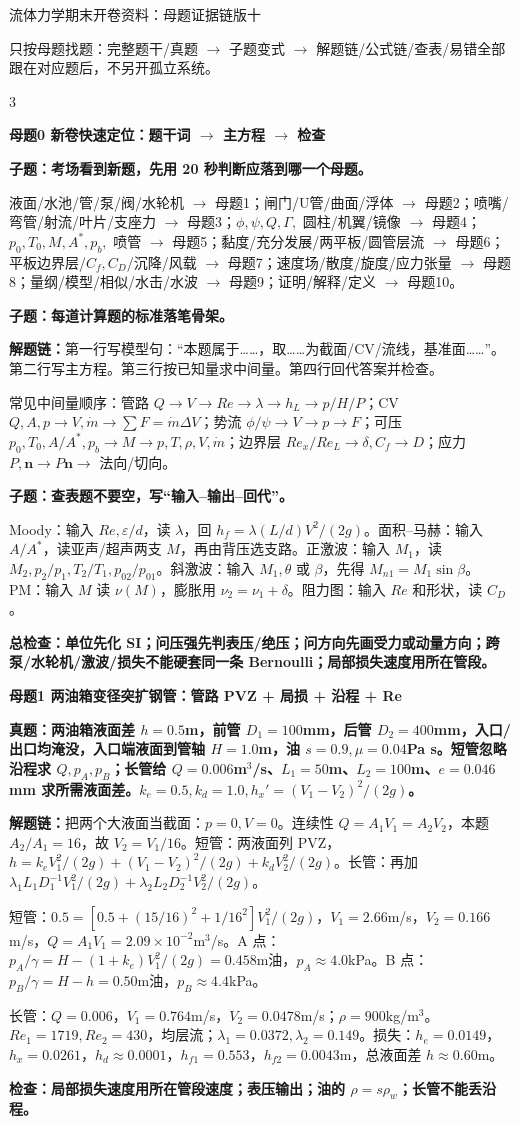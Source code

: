 \documentclass[a4paper]{article}
\newcommand{\mt}[1]{\vspace{0.45pt}\colorbox{M}{\parbox{\dimexpr\linewidth-2\fboxsep}{\color{white}\bfseries #1}}\par}
\newcommand{\qt}[1]{\vspace{0.25pt}\colorbox{Q}{\parbox{\dimexpr\linewidth-2\fboxsep}{\color{white}\bfseries #1}}\par}
\newcommand{\ans}[1]{\colorbox{G}{\parbox{\dimexpr\linewidth-2\fboxsep}{#1}}\par}
\newcommand{\warn}[1]{\colorbox{Y}{\parbox{\dimexpr\linewidth-2\fboxsep}{\color{E}\bfseries #1}}\par}
\newcommand{\chain}[1]{{\color{A}\bfseries 解题链：}#1\par}
\begin{document}
\fontsize{3.08}{3.22}\selectfont
\begin{center}
{\heiti\fontsize{6.5}{6.8}\selectfont 流体力学期末开卷资料：母题证据链版十}\par
{\fontsize{3.20}{3.38}\selectfont 只按母题找题：完整题干/真题 $\to$ 子题变式 $\to$ 解题链/公式链/查表/易错全部跟在对应题后，不另开孤立系统。}
\end{center}
\vspace{-3.4pt}
\begin{multicols}{3}

\mt{母题0 新卷快速定位：题干词 $\to$ 主方程 $\to$ 检查}
\qt{子题：考场看到新题，先用 20 秒判断应落到哪一个母题。}
\ans{液面/水池/管/泵/阀/水轮机 $\to$ 母题1；闸门/U管/曲面/浮体 $\to$ 母题2；喷嘴/弯管/射流/叶片/支座力 $\to$ 母题3；$\phi,\psi,Q,\Gamma,$ 圆柱/机翼/镜像 $\to$ 母题4；$p_0,T_0,M,A^*,p_b,$ 喷管 $\to$ 母题5；黏度/充分发展/两平板/圆管层流 $\to$ 母题6；平板边界层/$C_f,C_D$/沉降/风载 $\to$ 母题7；速度场/散度/旋度/应力张量 $\to$ 母题8；量纲/模型/相似/水击/水波 $\to$ 母题9；证明/解释/定义 $\to$ 母题10。}
\qt{子题：每道计算题的标准落笔骨架。}
\chain{第一行写模型句：“本题属于……，取……为截面/CV/流线，基准面……”。第二行写主方程。第三行按已知量求中间量。第四行回代答案并检查。}
\ans{常见中间量顺序：管路 $Q\to V\to Re\to\lambda\to h_L\to p/H/P$；CV $Q,A,p\to V,\dot m\to \sum F=\dot m\Delta V$；势流 $\phi/\psi\to V\to p\to F$；可压 $p_0,T_0,A/A^*,p_b\to M\to p,T,\rho,V,\dot m$；边界层 $Re_x/Re_L\to\delta,C_f\to D$；应力 $P,\bm n\to P\bm n\to$ 法向/切向。}
\qt{子题：查表题不要空，写“输入--输出--回代”。}
\ans{Moody：输入 $Re,\varepsilon/d$，读 $\lambda$，回 $h_f=\lambda(L/d)V^2/(2g)$。面积--马赫：输入 $A/A^*$，读亚声/超声两支 $M$，再由背压选支路。正激波：输入 $M_1$，读 $M_2,p_2/p_1,T_2/T_1,p_{02}/p_{01}$。斜激波：输入 $M_1,\theta$ 或 $\beta$，先得 $M_{n1}=M_1\sin\beta$。PM：输入 $M$ 读 $\nu(M)$，膨胀用 $\nu_2=\nu_1+\delta$。阻力图：输入 $Re$ 和形状，读 $C_D$。}
\warn{总检查：单位先化 SI；问压强先判表压/绝压；问方向先画受力或动量方向；跨泵/水轮机/激波/损失不能硬套同一条 Bernoulli；局部损失速度用所在管段。}


\mt{母题1 两油箱变径突扩钢管：管路 PVZ + 局损 + 沿程 + Re}
\qt{真题：两油箱液面差 $h=0.5$m，前管 $D_1=100$mm，后管 $D_2=400$mm，入口/出口均淹没，入口端液面到管轴 $H=1.0$m，油 $s=0.9,\mu=0.04$Pa s。短管忽略沿程求 $Q,p_A,p_B$；长管给 $Q=0.006$m$^3$/s、$L_1=50$m、$L_2=100$m、$e=0.046$mm 求所需液面差。$k_e=0.5,k_d=1.0,h_x'=(V_1-V_2)^2/(2g)$。}
\chain{把两个大液面当截面：$p=0,V=0$。连续性 $Q=A_1V_1=A_2V_2$，本题 $A_2/A_1=16$，故 $V_2=V_1/16$。短管：两液面列 PVZ，$h=k_eV_1^2/(2g)+(V_1-V_2)^2/(2g)+k_dV_2^2/(2g)$。长管：再加 $\lambda_1L_1D_1^{-1}V_1^2/(2g)+\lambda_2L_2D_2^{-1}V_2^2/(2g)$。}
\ans{短管：$0.5=[0.5+(15/16)^2+1/16^2]V_1^2/(2g)$，$V_1=2.66$m/s，$V_2=0.166$m/s，$Q=A_1V_1=2.09\times10^{-2}$m$^3$/s。A 点：$p_A/\gamma=H-(1+k_e)V_1^2/(2g)=0.458$m油，$p_A\approx4.0$kPa。B 点：$p_B/\gamma=H-h=0.50$m油，$p_B\approx4.4$kPa。}
\ans{长管：$Q=0.006$，$V_1=0.764$m/s，$V_2=0.0478$m/s；$\rho=900$kg/m$^3$。$Re_1=1719,Re_2=430$，均层流；$\lambda_1=0.0372,\lambda_2=0.149$。损失：$h_e=0.0149$，$h_x=0.0261$，$h_d\approx0.0001$，$h_{f1}=0.553$，$h_{f2}=0.0043$m，总液面差 $h\approx0.60$m。}
\warn{检查：局部损失速度用所在管段速度；表压输出；油的 $\rho=s\rho_w$；长管不能丢沿程。}


\end{multicols}
\end{document}

